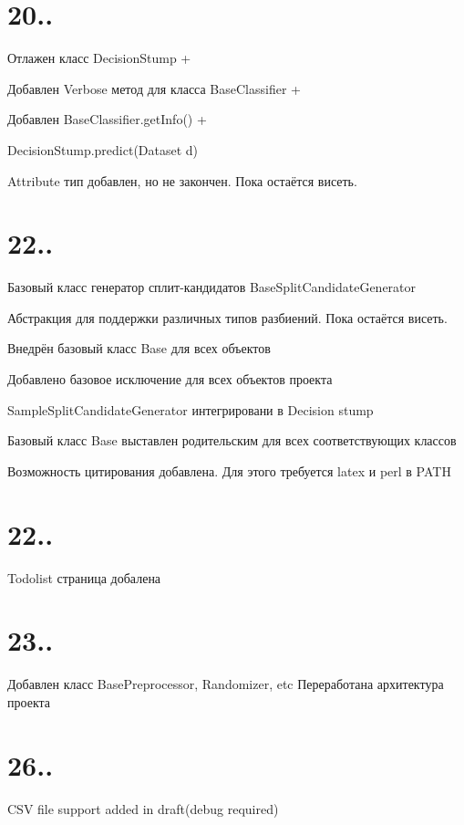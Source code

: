 \hypertarget{_detailed_one_sec}{}\section{20..}\label{_detailed_one_sec}
Отлажен класс Decision\-Stump +

Добавлен Verbose метод для класса Base\-Classifier +

Добавлен Base\-Classifier.\-get\-Info() +

Decision\-Stump.\-predict(\-Dataset d)

Attribute тип добавлен, но не закончен. Пока остаётся висеть.



 \hypertarget{_detailed_two_sec}{}\section{22..}\label{_detailed_two_sec}
Базовый класс генератор сплит-\/кандидатов Base\-Split\-Candidate\-Generator

Абстракция для поддержки различных типов разбиений. Пока остаётся висеть.

Внедрён базовый класс Base для всех объектов

Добавлено базовое исключение для всех объектов проекта

Sample\-Split\-Candidate\-Generator интегрировани в Decision stump

Базовый класс Base выставлен родительским для всех соответствующих классов

Возможность цитирования \cite{louppe2014understanding} добавлена. Для этого требуется latex и perl в P\-A\-T\-H 

 \hypertarget{_detailed_two_sec}{}\section{22..}\label{_detailed_two_sec}
Todolist страница добалена 

 \hypertarget{_detailed_three_sec}{}\section{23..}\label{_detailed_three_sec}
Добавлен класс Base\-Preprocessor, Randomizer, etc Переработана архитектура проекта 

\hypertarget{_detailed_four_sec}{}\section{26..}\label{_detailed_four_sec}
C\-S\-V file support added in draft(debug required)

